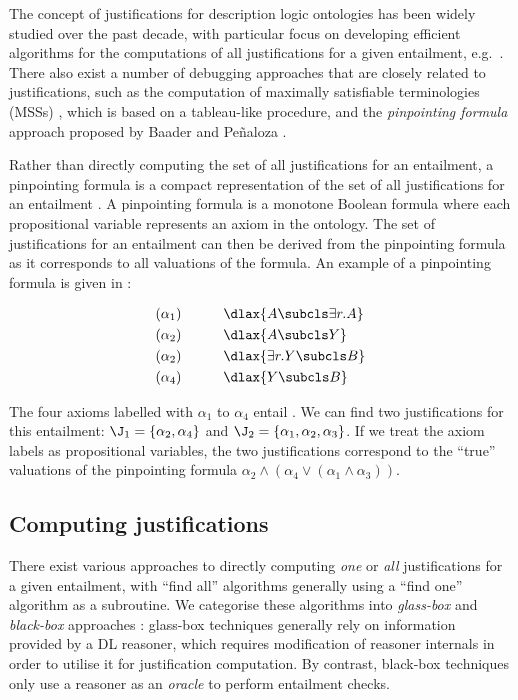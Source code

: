 The concept of justifications for description logic ontologies has been widely studied over the past decade, with particular focus on developing efficient algorithms for the computations of all justifications for a given entailment, e.g.\ \cite{schlobach05vd,suntisrivaraporn08aa,du09bn}. There also exist a number of debugging approaches that are closely related to justifications, such as the computation of maximally satisfiable terminologies (MSSs) \cite{meyer06rj,meyer06aa}, which is based on a tableau-like procedure, and the \emph{pinpointing formula} approach proposed by Baader and Pe\~{n}aloza \cite{baader07ur,baader08tp,ji08en,penaloza10ff}.

Rather than directly computing the set of all justifications for an entailment, a pinpointing formula is a compact representation of the set of all justifications for an entailment \cite{baader07ur,baader08tp,penaloza10ff}. A pinpointing formula is a monotone Boolean formula where each propositional variable represents an axiom in the ontology. The set of justifications for an entailment can then be derived from the pinpointing formula as it corresponds to all valuations of the formula. An example of a pinpointing formula is given in \cite{baader07ur}:
\begin{examp}
\begin{alignat*}{2}
 (\alpha_{1})  & \quad\quad & &\dlax{A \subcls \exists r.A}  \\
 (\alpha_{2})  & \quad\quad & &\dlax{A \subcls Y}  \\	
 (\alpha_{2})  & \quad\quad & &\dlax{\exists r.Y \subcls  B}  \\
 (\alpha_{4})  & \quad\quad & &\dlax{Y \subcls B}
\end{alignat*}
\end{examp}
The four axioms labelled with $\alpha_{1}$ to $\alpha_{4}$ entail . We can find two justifications for this entailment: $\J_{1} = \{\alpha_{2}, \alpha_{4} \}$ and $\J_{2} = \{\alpha_{1}, \alpha_{2}, \alpha_{3} \}$. If we treat the axiom labels as propositional variables, the two justifications correspond to the \enquote{true} valuations of the pinpointing formula $\alpha_{2} \wedge ( \alpha_{4} \vee (\alpha_{1} \wedge \alpha_{3} ))$. 

\subsection{Computing justifications}
There exist various approaches to directly computing \emph{one} or \emph{all} justifications for a given entailment, with \enquote{find all} algorithms generally using a \enquote{find one} algorithm as a subroutine. We categorise these algorithms into \emph{glass-box} and \emph{black-box} approaches \cite{kalyanpur05mi}: glass-box techniques generally rely on information provided by a DL reasoner, which requires modification of reasoner internals in order to utilise it for justification computation. By contrast, black-box techniques only use a reasoner as an \emph{oracle} to perform entailment checks.

